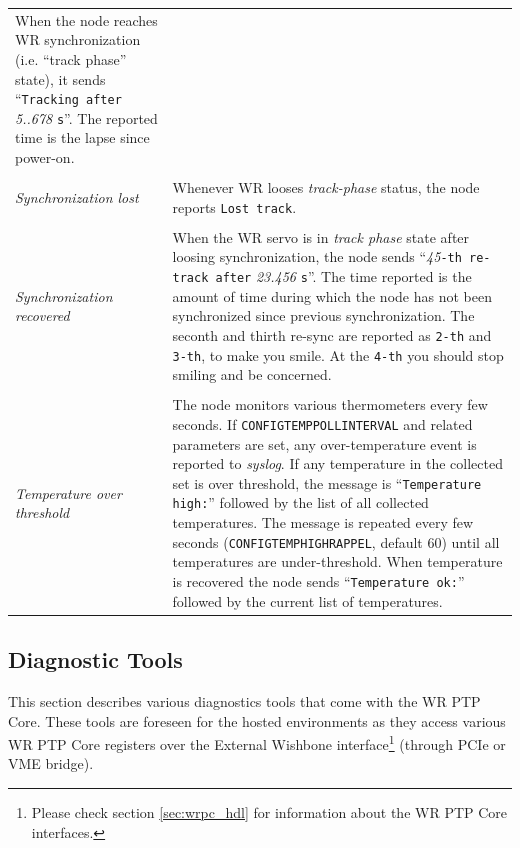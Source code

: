 \documentclass[a4paper, 12pt]{article}
\renewcommand{\_}{\underscore\allowbreak}
\begin{document}
\begin{sloppypar}
\begin{longtable}{  p{6.5cm}  p{9cm} }
	When the node reaches WR synchronization (i.e. ``track phase''
        state), it sends ``\texttt{Tracking after} \textit{5..678} \texttt{s}''.
        The reported time is the lapse since power-on.\\
& \\
\textit{ Synchronization lost } &

	Whenever WR looses \textit{track-phase} status, the node reports
        \texttt{Lost track}.\\
& \\
\textit{ Synchronization recovered } &

	When the WR servo is in \textit{track phase} state after loosing
        synchronization, the node sends ``\textit{45}\texttt{-th re-track after}
        \textit{23.456} \texttt{s}''. The time reported is the amount of time
        during which the node has not been synchronized since previous synchronization. 
        The seconth and
        thirth re-sync are reported as \texttt{2-th} and \texttt{3-th}, to make you
        smile. At the \texttt{4-th} you should stop smiling and be concerned.\\
& \\
\textit{ Temperature over threshold } &

	The node monitors various thermometers every few seconds.
        If \texttt{CONFIG\_TEMP\_POLL\_INTERVAL} and related parameters are
        set, any over-temperature event is reported to \textit{syslog}.
        If any temperature in the collected set is over threshold,
        the message is ``\texttt{Temperature high:}'' followed by the list of
        all collected temperatures.  The message is repeated every
        few seconds (\texttt{CONFIG\_TEMP\_HIGH\_RAPPEL}, default 60)
        until all temperatures are under-threshold. When temperature
        is recovered the node sends ``\texttt{Temperature ok:}'' followed by
        the current list of temperatures.\\
\end{longtable}
\end{sloppypar}


\newpage
\subsection{Diagnostic Tools}
\label{Diagnostic Tools}
This section describes various diagnostics tools that come with the WR PTP Core.
These tools are foreseen for the hosted environments as they access various WR
PTP Core registers over the External Wishbone interface\footnote{Please check
section \ref{sec:wrpc_hdl} for information about the WR PTP Core interfaces.}
(through PCIe or VME bridge).
\end{document}

